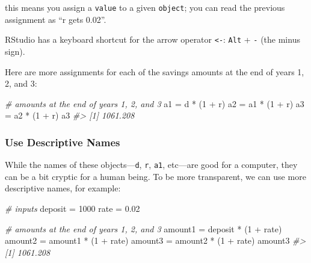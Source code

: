 \documentclass[
]{book}
\newenvironment{Shaded}{\begin{snugshade}}{\end{snugshade}}
\newcommand{\CommentTok}[1]{\textcolor[rgb]{0.56,0.35,0.01}{\textit{#1}}}
\newcommand{\DecValTok}[1]{\textcolor[rgb]{0.00,0.00,0.81}{#1}}
\newcommand{\FloatTok}[1]{\textcolor[rgb]{0.00,0.00,0.81}{#1}}
\newcommand{\NormalTok}[1]{#1}
\newcommand{\OtherTok}[1]{\textcolor[rgb]{0.56,0.35,0.01}{#1}}
\newcommand{\SpecialCharTok}[1]{\textcolor[rgb]{0.00,0.00,0.00}{#1}}
\begin{document}
this means you assign a \texttt{value} to a given \texttt{object};
you can read the previous assignment as ``r gets 0.02''.

RStudio has a keyboard shortcut for the arrow operator \texttt{\textless{}-}:
\texttt{Alt} + \texttt{-} (the minus sign).

Here are more assignments for each of the savings amounts at the end of years
1, 2, and 3:

\begin{Shaded}
\begin{Highlighting}[]
\CommentTok{\# amounts at the end of years 1, 2, and 3}
\NormalTok{a1 }\OtherTok{=}\NormalTok{ d }\SpecialCharTok{*}\NormalTok{ (}\DecValTok{1} \SpecialCharTok{+}\NormalTok{ r)}
\NormalTok{a2 }\OtherTok{=}\NormalTok{ a1 }\SpecialCharTok{*}\NormalTok{ (}\DecValTok{1} \SpecialCharTok{+}\NormalTok{ r)}
\NormalTok{a3 }\OtherTok{=}\NormalTok{ a2 }\SpecialCharTok{*}\NormalTok{ (}\DecValTok{1} \SpecialCharTok{+}\NormalTok{ r)}
\NormalTok{a3}
\CommentTok{\#\textgreater{} [1] 1061.208}
\end{Highlighting}
\end{Shaded}

\hypertarget{use-descriptive-names}{%
\subsubsection*{Use Descriptive Names}\label{use-descriptive-names}}

While the names of these objects---\texttt{d}, \texttt{r}, \texttt{a1}, etc---are good for a
computer, they can be a bit cryptic for a human being. To be more transparent,
we can use more descriptive names, for example:

\begin{Shaded}
\begin{Highlighting}[]
\CommentTok{\# inputs}
\NormalTok{deposit }\OtherTok{=} \DecValTok{1000}
\NormalTok{rate }\OtherTok{=} \FloatTok{0.02}

\CommentTok{\# amounts at the end of years 1, 2, and 3}
\NormalTok{amount1 }\OtherTok{=}\NormalTok{ deposit }\SpecialCharTok{*}\NormalTok{ (}\DecValTok{1} \SpecialCharTok{+}\NormalTok{ rate)}
\NormalTok{amount2 }\OtherTok{=}\NormalTok{ amount1 }\SpecialCharTok{*}\NormalTok{ (}\DecValTok{1} \SpecialCharTok{+}\NormalTok{ rate)}
\NormalTok{amount3 }\OtherTok{=}\NormalTok{ amount2 }\SpecialCharTok{*}\NormalTok{ (}\DecValTok{1} \SpecialCharTok{+}\NormalTok{ rate)}
\NormalTok{amount3}
\CommentTok{\#\textgreater{} [1] 1061.208}
\end{Highlighting}
\end{Shaded}
\end{document}
